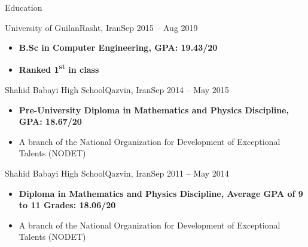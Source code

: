 \documentclass[]{mcdowellcv}
\begin{document}
	\makeheader
	

    \begin{cvsection}{Education}
    	\begin{cvsubsection}{University of Guilan}{Rasht, Iran}{Sep 2015 -- Aug 2019}
    	    \setlength{\columnsep}{-2.1in}
    		\begin{itemize}
    			\item \textbf{B.Sc in Computer Engineering, GPA: 19.43/20 }
    			\item \textbf{Ranked 1\textsuperscript{st} in class}
    		\end{itemize}
    	\end{cvsubsection}
    	
    	\begin{cvsubsection}{Shahid Babayi High School}{Qazvin, Iran}{Sep 2014 -- May 2015}
    	    \setlength{\columnsep}{-2.1in}
    		\begin{itemize}
    			\item \textbf{Pre-University Diploma in Mathematics and Physics Discipline,  GPA: 18.67/20}
    			\item A branch of the National Organization for Development of Exceptional Talents (NODET) 
    		\end{itemize}
    	\end{cvsubsection}
    	
    	\begin{cvsubsection}{Shahid Babayi High School}{Qazvin, Iran}{Sep 2011 -- May 2014}
    	    \setlength{\columnsep}{-2.1in}
    		\begin{itemize}
    			\item \textbf{Diploma in Mathematics and Physics Discipline, Average GPA of 9 to 11 Grades: 18.06/20}
    			\item A branch of the National Organization for Development of Exceptional Talents (NODET) 
    		\end{itemize}
    	\end{cvsubsection}
    \end{cvsection}
    
\end{document}
